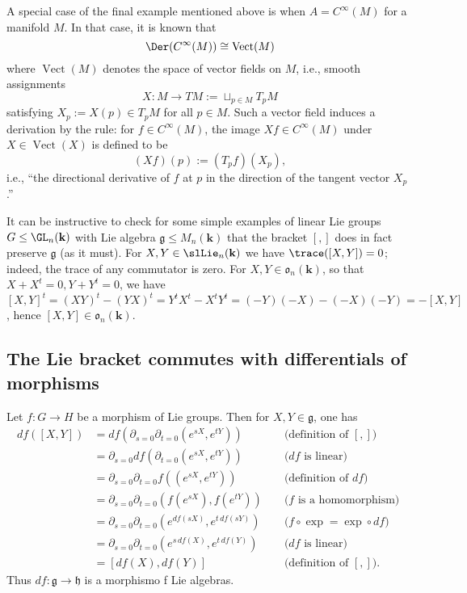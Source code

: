\documentclass[reqno]{amsart} 
\begin{document}
A special case of the final example mentioned above
is when $A = C^\infty(M)$
for a manifold $M$.
In that case,
it is known that
\begin{equation*}
  \Der(C^\infty(M))
  \cong \operatorname{Vect}(M)
\end{equation*}
where $\operatorname{Vect}(M)$ denotes the space of vector fields
on $M$,
i.e.,
smooth assignments
\begin{equation*}
  X : M \rightarrow T M := \sqcup_{p \in M} T_p M
\end{equation*}
satisfying $X_p := X(p) \in T_p M$ for all $p \in M$.
Such a vector field induces a derivation
by the rule: for $f \in C^\infty(M)$,
the image $X f \in C^\infty(M)$ under $X \in \operatorname{Vect}(X)$
is defined to be
\begin{equation*}
  (X f)(p) := (T_p f)(X_p),
\end{equation*}
i.e., ``the directional derivative of $f$ at $p$ in the direction
of the tangent vector $X_p$.''


\begin{remark}
  It can be instructive to check for some simple examples
  of linear Lie groups $G \leq \GL_n(\mathbf{k})$
  with Lie algebra $\mathfrak{g} \leq M_n(\mathbf{k})$
  that the bracket $[,]$ does in fact preserve $\mathfrak{g}$
  (as it must).
  For $X,Y \in \slLie_n(\mathbf{k})$
  we have $\trace([X,Y]) = 0$; indeed, the trace of any commutator
  is zero.
  For $X,Y \in \mathfrak{o}_n(\mathbf{k})$,
  so that $X + X^t = 0, Y + Y^t = 0$,
  we have $[X,Y]^t = (X Y)^t - (Y X)^t
  = Y^t X^t - X^t Y^t
  = (-Y)(-X) - (-X)(-Y)
  = -[X,Y]$,
  hence $[X,Y] \in \mathfrak{o}_n(\mathbf{k})$.
\end{remark}

\subsection{The Lie bracket commutes with differentials of morphisms\label{sec:diff-morphism-is-morphism}}
\label{sec:org96fd5c4}
Let $f : G \rightarrow H$ be a morphism of Lie groups.
Then for $X, Y \in \mathfrak{g}$,
one has
\begin{align*}
  d f ([X,Y])
  &=
    d f( \partial_{s=0} \partial_{t=0} (e^{s X}, e^{t Y}))
  &&
  \text{ (definition of $[,]$) }
  \\ 
  &=
    \partial_{s=0}  d f( \partial_{t=0} (e^{s X}, e^{t Y}))
    && \text{ ($d f$ is linear) }
    \\
  &=
    \partial_{s=0}  \partial_{t=0}
    f(  (e^{s X}, e^{t Y}))
    && \text{ (definition of $d f$) }
    \\
  &=
    \partial_{s=0}  \partial_{t=0}
    (f(e^{s X}), f(e^{t Y}))
    && \text{ ($f$ is a homomorphism) }
    \\
  &=
    \partial_{s=0}  \partial_{t=0}
    (e^{d f(s X)}, e^{t \, d f(s Y)})
  && \text{ ($f \circ \exp = \exp \circ d f$)}
     \\
  &=
    \partial_{s=0}  \partial_{t=0}
    (e^{s \, d f(X)}, e^{t \, d f(Y)})
  && \text{ ($d f$ is linear)}
     \\
  &=
    [d f(X), d f(Y)]
  && \text{ (definition of $[,]$)}.
\end{align*}
Thus $d f : \mathfrak{g} \rightarrow \mathfrak{h}$ is a morphismo f Lie algebras.
\end{document}
